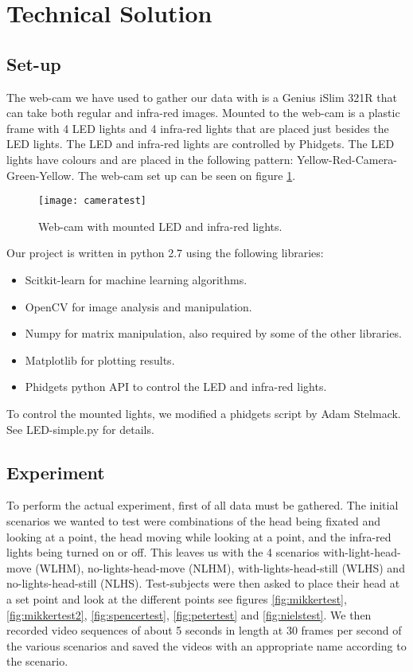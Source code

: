 \section{Technical Solution}
\subsection{Set-up}
The web-cam we have used to gather our data with is a Genius iSlim 321R that can take both regular and infra-red images.
Mounted to the web-cam is a plastic frame with 4 LED lights and 4 infra-red lights that are placed just besides the LED lights.
The LED and infra-red lights are controlled by Phidgets. %
The LED lights have colours and are placed in the following pattern: Yellow-Red-Camera-Green-Yellow.
The web-cam set up can be seen on figure \ref{fig:webcam}.
\begin{figure}
\centering
\texttt{[image: cameratest]}
\caption{Web-cam with mounted LED and infra-red lights.}
\label{fig:webcam}
\end{figure}

Our project is written in python 2.7 using the following libraries: 
\begin{itemize} %
\item{Scitkit-learn for machine learning algorithms.}
\item{OpenCV for image analysis and manipulation.}
\item{Numpy for matrix manipulation, also required by some of the other libraries.}
\item{Matplotlib for plotting results.}
\item{Phidgets python API to control the LED and infra-red lights.}
\end{itemize}

To control the mounted lights, we modified a phidgets script by Adam Stelmack. See LED-simple.py for details. %

\subsection{Experiment}
To perform the actual experiment, first of all data must be gathered.
The initial scenarios we wanted to test were combinations of the head being fixated and looking at a point, the head moving while looking at a point, and the infra-red lights being turned on or off.
This leaves us with the 4 scenarios with-light-head-move (WLHM), no-lights-head-move (NLHM), with-lights-head-still (WLHS) and no-lights-head-still (NLHS).
Test-subjects were then asked to place their head at a set point and look at the different points see figures \ref{fig:mikkertest}, \ref{fig:mikkertest2}, \ref{fig:spencertest}, \ref{fig:petertest} and \ref{fig:nielstest}.
We then recorded video sequences of about 5 seconds in length at 30 frames per second of the various scenarios and saved the videos with an appropriate name according to the scenario.

